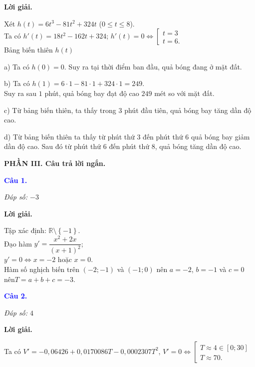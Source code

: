 \documentclass[12pt,a4paper]{article}
\begin{document}
\noindent\textbf{Lời giải.}

Xét $h(t)=6t^3 -81t^2 +324t$ ($0\leq t\leq 8$).\\

		Ta có $h'(t) = 18t^2 -162t +324$; $h'(t) = 0 \Leftrightarrow \left[\begin{array}{l}t=3\\t=6.\end{array}\right.$\\

					Bảng biến thiên $h(t)$

		a)  Ta có $h(0) = 0$. Suy ra tại thời điểm ban đầu, quả bóng đang ở mặt đất.
			
b)  Ta có $h(1) = 6\cdot 1 -81\cdot 1+324\cdot 1 = 249$.\\

			Suy ra sau $1$ phút, quả bóng bay đạt độ cao $249$ mét so với mặt đất.
			
c)  Từ bảng biến thiên, ta thấy trong $3$ phút đầu tiên, quả bóng bay tăng dần độ cao.
			
d)  Từ bảng biến thiên ta thấy từ phút thứ $3$ đến phút thứ $6$ quả bóng bay giảm dần độ cao. Sau đó từ phút thứ $6$ đến phút thứ $8$, quả bóng tăng dần độ cao.

\medskip
\noindent\textbf{PHẦN III. Câu trả lời ngắn.}

\medskip

\noindent\textcolor{blue}{\textbf{Câu 1.}}

\noindent \textit{Đáp số: $-3$}

\noindent\textbf{Lời giải.}

Tập xác định: $\mathbb{R}\setminus\left\{-1\right\}$.\\

			Đạo hàm $y'=\dfrac{x^2 + 2 x}{\left(x + 1\right)^2}$;\\
$y'=0 \Leftrightarrow x=-2$ hoặc $x=0$.\\


	Hàm số nghịch biến trên $(-2;-1)$ và  $(-1;0)$ nên $a=-2$, $b=-1$ và $c=0$ nên\break $T=a+b+c=-3$.

\medskip
\noindent\textcolor{blue}{\textbf{Câu 2.}}

\noindent \textit{Đáp số: $4$}

\noindent\textbf{Lời giải.}

Ta có $V'=-0,06426+0,0170086T-0,0002307T^2$, $V'=0\Leftrightarrow \left[\begin{array}{l}T\approx 4\in [0;30]\\T\approx 70.\end{array}\right.$\\
\end{document}
